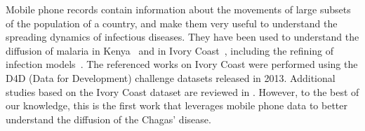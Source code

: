 Mobile phone records contain information about the movements of large subsets of the population of a country, and make them very useful to understand the spreading dynamics of infectious diseases. They have been used to understand the diffusion of malaria in Kenya~\cite{wesolowski2012quantifying} and in Ivory Coast~\cite{enns2013human}, including the refining of infection models~\cite{chunara2013large}. 
The referenced works on Ivory Coast were performed using the D4D (Data for Development) challenge datasets released in 2013. Additional studies based on the Ivory Coast dataset are reviewed in \cite{naboulsi2015mobile}.
However, to the best of our knowledge, this is the first work that leverages mobile phone data to better understand the diffusion of the Chagas' disease.

